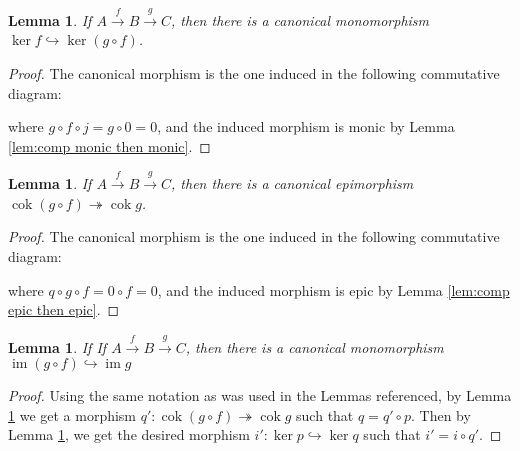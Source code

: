 \documentclass{article}
\DeclareMathOperator{\im}{im}
\DeclareMathOperator{\cok}{cok}
\newtheorem{lemma}[theorem]{Lemma}
\begin{document}
\begin{lemma}\label{lem:ker of comp into ker of first}
    If $A\xrightarrow{f}B\xrightarrow{g}C$, then there is a canonical monomorphism $\ker f\hookrightarrow \ker (g\circ f)$.
\end{lemma}
\begin{proof}
    The canonical morphism is the one induced in the following commutative diagram:
    \begin{center}
    \end{center}
    where $g\circ f\circ j=g\circ 0=0$, and the induced morphism is monic by Lemma \ref{lem:comp monic then monic}.
\end{proof}
\begin{lemma}\label{lem:cok of comp onto cok of second}
    If $A\xrightarrow{f}B\xrightarrow{g}C$, then there is a canonical epimorphism $\cok (g\circ f) \twoheadrightarrow \cok g$.
\end{lemma}
\begin{proof}
    The canonical morphism is the one induced in the following commutative diagram:
    \begin{center}
    \end{center}
    where $q\circ g\circ f=0\circ f=0$, and the induced morphism is epic by Lemma \ref{lem:comp epic then epic}.
\end{proof}
\begin{lemma}\label{lem:im of comp into im of second}
    If If $A\xrightarrow{f}B\xrightarrow{g}C$, then there is a canonical monomorphism $\im (g\circ f) \hookrightarrow \im g$
\end{lemma}
\begin{proof}
    Using the same notation as was used in the Lemmas referenced, by Lemma \ref{lem:cok of comp onto cok of second} we get a morphism $q':\cok(g\circ f)\twoheadrightarrow \cok g$ such that $q=q'\circ p$. Then by Lemma \ref{lem:ker of comp into ker of first}, we get the desired morphism $i':\ker p\hookrightarrow \ker q$ such that $i'=i\circ q'$.
\end{proof}
\end{document}
